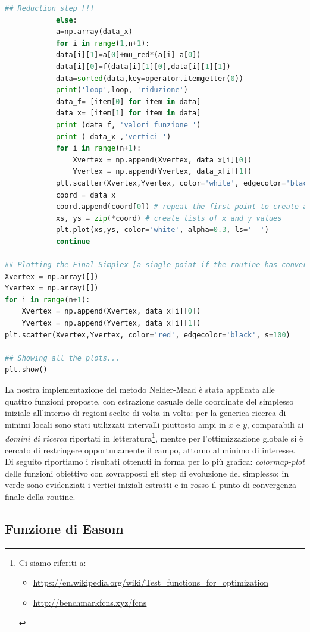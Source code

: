 \begin{lstlisting}[language=python, style=Pystyle, caption=\texttt{Python} code for Simplex Minimization Routine, label=list:Simplex, 	captionpos=b]
			## Reduction step [!]    
			else: 
			a=np.array(data_x)
			for i in range(1,n+1):
			data[i][1]=a[0]+mu_red*(a[i]-a[0])
			data[i][0]=f(data[i][1][0],data[i][1][1])
			data=sorted(data,key=operator.itemgetter(0)) 
			print('loop',loop, 'riduzione')
			data_f= [item[0] for item in data]
			data_x= [item[1] for item in data]
			print (data_f, 'valori funzione ')
			print ( data_x ,'vertici ')
			for i in range(n+1):
				Xvertex = np.append(Xvertex, data_x[i][0])
				Yvertex = np.append(Yvertex, data_x[i][1])
			plt.scatter(Xvertex,Yvertex, color='white', edgecolor='black')
			coord = data_x
			coord.append(coord[0]) # repeat the first point to create a 'closed loop'
			xs, ys = zip(*coord) # create lists of x and y values
			plt.plot(xs,ys, color='white', alpha=0.3, ls='--') 
			continue

## Plotting the Final Simplex [a single point if the routine has converged!]
Xvertex = np.array([])
Yvertex = np.array([])
for i in range(n+1):
	Xvertex = np.append(Xvertex, data_x[i][0])
	Yvertex = np.append(Yvertex, data_x[i][1])
plt.scatter(Xvertex,Yvertex, color='red', edgecolor='black', s=100)

## Showing all the plots...
plt.show()
\end{lstlisting}

\newpage

\noindent La nostra implementazione del metodo Nelder-Mead è stata applicata alle quattro funzioni proposte, con estrazione casuale delle coordinate del simplesso iniziale all'interno di regioni scelte di volta in volta: per la generica ricerca di minimi locali sono stati utilizzati intervalli piuttosto ampi in $x$ e $y$, comparabili ai \emph{domini di ricerca} riportati in letteratura\footnote{Ci siamo riferiti a: \begin{itemize} \item\url{https://en.wikipedia.org/wiki/Test_functions_for_optimization} \item\url{http://benchmarkfcns.xyz/fcns}\end{itemize} \label{WikipediaFootnote}}, mentre per l'ottimizzazione globale si è cercato di restringere opportunamente il campo, attorno al minimo di interesse. Di seguito riportiamo i risultati ottenuti in forma per lo più grafica: \emph{colormap-plot} delle funzioni obiettivo con sovrapposti gli step di evoluzione del simplesso; in verde sono evidenziati i vertici iniziali estratti e in rosso il punto di convergenza finale della routine.

\subsection*{Funzione di Easom}

